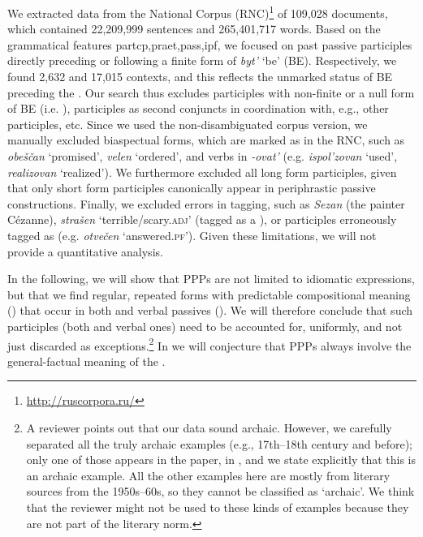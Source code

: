 \documentclass[output=paper,modfonts,newtxmath,hidelinks
\ChapterDOI{10.5281/zenodo.2545513}
]{langscibook}
\begin{document}
We extracted data from the  National Corpus (RNC)\footnote{\url{http://ruscorpora.ru/}} of 109,028 documents, which contained 22,209,999 sentences and 265,401,717 words.  Based on the grammatical features partcp,praet,pass,ipf, we focused on  past passive participles directly preceding or following a finite form of \textit{byt'} `be' (BE). Respectively, we found 2,632 and 17,015 contexts, and this reflects the unmarked  status of BE preceding the . Our search thus excludes participles with non-finite or a null form of BE (i.e. ), participles as second conjuncts in coordination with, e.g., other participles, etc. Since we used the non-disambiguated corpus version, we manually excluded biaspectual forms, which are marked as  in the RNC, such as \textit{obeščan} `promised', \textit{velen} `ordered', and verbs in \textit{-ovat'} (e.g. \textit{ispol'zovan} `used', \textit{realizovan} `realized'). We furthermore excluded all long form participles, given that only short form participles canonically appear in  periphrastic passive constructions. Finally, we excluded errors in tagging, such as \textit{Sezan} (the  painter Cézanne), \textit{strašen} `terrible/scary.\textsc{adj}' (tagged as a ), or  participles erroneously tagged as  (e.g. \textit{otvečen} `answered.\textsc{pf}'). Given these limitations, we will not provide a quantitative analysis. 
 
\largerpage
In the following, we will show that  PPPs are not limited to idiomatic expressions, but that we find regular, repeated forms with predictable compositional meaning () that occur in both  and verbal passives (). We will therefore conclude that such participles (both  and verbal ones) need to be accounted for, uniformly, and not just discarded as exceptions.\footnote{A reviewer points out that our data sound archaic. However, we carefully separated all the truly archaic examples (e.g., 17th--18th century and before); only one of those appears in the paper, in , and we state explicitly that this is an archaic example. All the other examples here are mostly from literary sources from the 1950s--60s, so they cannot be classified as `archaic'. We think that the reviewer might not be used to these kinds of examples because they are not part of the literary norm.} In  we will conjecture that  PPPs always involve the general-factual meaning of the .
\end{document}

